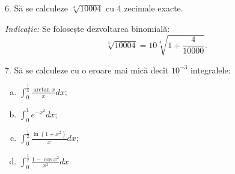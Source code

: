 \documentclass[11pt,a4paper]{article}
\newcommand\ds{\displaystyle}
\theoremstyle{dotless}
\theoremstyle{dotlessdr}
\begin{document}
\vspace{1cm}

6. Să se calculeze $\sqrt[4]{10004}$ cu 4 zecimale exacte.

\emph{Indicație:} Se folosește dezvoltarea binomială:
\[
  \sqrt[4]{10004} = 10 \sqrt[4]{1 + \frac{4}{10000}}.
\]

\vspace{1cm}

7. Să se calculeze cu o eroare mai mică decît $10^{-3}$ integralele:
\begin{enumerate}[(a)]
\item $\ds\int_0^{\frac{1}{3}} \frac{\arctan x}{x} dx$;
\item $\ds\int_0^1 e^{-x^2} dx$;
\item $\ds\int_0^{\frac{1}{2}} \frac{\ln(1 + x^2)}{x} dx$;
\item $\ds\int_0^{\frac{1}{2}} \frac{1 - \cos x^2}{x^2} dx$.
\end{enumerate}
\end{document}

